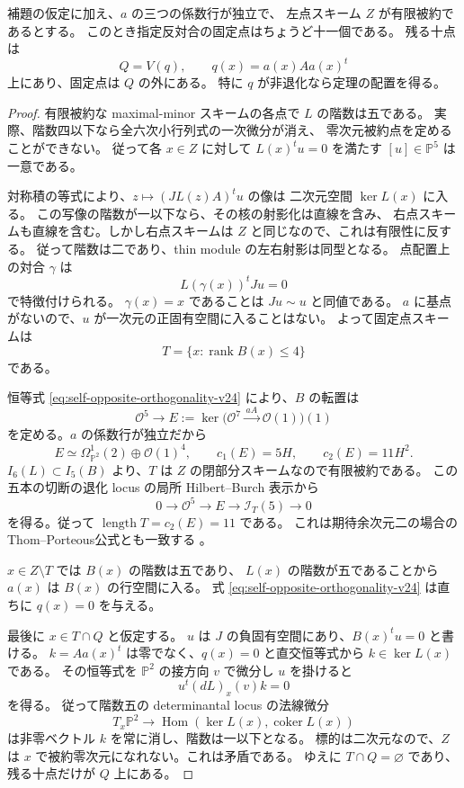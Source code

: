 \begin{proposition}[有限被約の場合の分解]\label{prop:11-plus-10-v24}
補題の仮定に加え、$a$ の三つの係数行が独立で、
左点スキーム $Z$ が有限被約であるとする。
このとき指定反対合の固定点はちょうど十一個である。
残る十点は
\[
 Q=V(q),\qquad q(x)=a(x)Aa(x)^t
\]
上にあり、固定点は $Q$ の外にある。
特に $q$ が非退化なら定理の配置を得る。
\end{proposition}
\begin{proof}
有限被約な maximal-minor スキームの各点で $L$ の階数は五である。
実際、階数四以下なら全六次小行列式の一次微分が消え、
零次元被約点を定めることができない。
従って各 $x\in Z$ に対して $L(x)^t u=0$ を満たす $[u]\in\mathbb P^5$ は一意である。

対称積の等式により、$z\mapsto (J L(z)A)^t u$ の像は
二次元空間 $\ker L(x)$ に入る。
この写像の階数が一以下なら、その核の射影化は直線を含み、
右点スキームも直線を含む。しかし右点スキームは $Z$ と同じなので、これは有限性に反する。
従って階数は二であり、thin module の左右射影は同型となる。
点配置上の対合 $\gamma$ は
\[
 L(\gamma(x))^t Ju=0
\]
で特徴付けられる。
$\gamma(x)=x$ であることは $Ju\sim u$ と同値である。
$a$ に基点がないので、$u$ が一次元の正固有空間に入ることはない。
よって固定点スキームは
\[
 T=\{x:\operatorname{rank}B(x)\leq4\}
\]
である。

恒等式 \eqref{eq:self-opposite-orthogonality-v24} により、$B$ の転置は
\[
 \mathcal O^5\longrightarrow
 E:=\ker\bigl(\mathcal O^7\xrightarrow{\,aA\,}\mathcal O(1)\bigr)(1)
\]
を定める。$a$ の係数行が独立だから
\[
 E\simeq\Omega^1_{\mathbb P^2}(2)\oplus\mathcal O(1)^4,
 \qquad c_1(E)=5H,\qquad c_2(E)=11H^2.
\]
$I_6(L)\subset I_5(B)$ より、$T$ は $Z$ の閉部分スキームなので有限被約である。
この五本の切断の退化 locus の局所 Hilbert--Burch 表示から
\[
 0\longrightarrow\mathcal O^5\longrightarrow E
   \longrightarrow\mathcal I_T(5)\longrightarrow0
\]
を得る。従って $\operatorname{length}T=c_2(E)=11$ である。
これは期待余次元二の場合のThom--Porteous公式とも一致する
\cite[\S14.4]{FultonIntersection}。

$x\in Z\setminus T$ では $B(x)$ の階数は五であり、
$L(x)$ の階数が五であることから $a(x)$ は $B(x)$ の行空間に入る。
式 \eqref{eq:self-opposite-orthogonality-v24} は直ちに $q(x)=0$ を与える。

最後に $x\in T\cap Q$ と仮定する。
$u$ は $J$ の負固有空間にあり、$B(x)^tu=0$ と書ける。
$k=Aa(x)^t$ は零でなく、$q(x)=0$ と直交恒等式から $k\in\ker L(x)$ である。
その恒等式を $\mathbb P^2$ の接方向 $v$ で微分し $u$ を掛けると
\[
 u^t(dL)_x(v)k=0
\]
を得る。
従って階数五の determinantal locus の法線微分
\[
 T_x\mathbb P^2\longrightarrow
 \operatorname{Hom}(\ker L(x),\operatorname{coker}L(x))
\]
は非零ベクトル $k$ を常に消し、階数は一以下となる。
標的は二次元なので、$Z$ は $x$ で被約零次元になれない。これは矛盾である。
ゆえに $T\cap Q=\varnothing$ であり、残る十点だけが $Q$ 上にある。
\end{proof}

